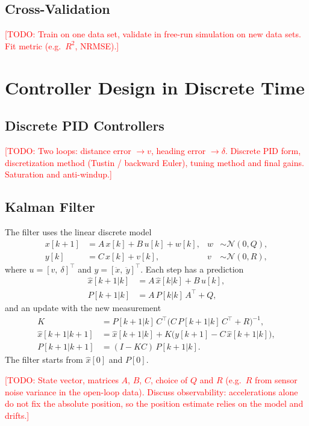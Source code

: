 \documentclass[conference]{IEEEtran}
\newcommand{\todo}[1]{\textcolor{red}{[TODO: #1]}}
\begin{document}
\subsection{Cross-Validation}
\todo{Train on one data set, validate in free-run simulation on new data
sets. Fit metric (e.g.\ $R^2$, NRMSE).}

\section{Controller Design in Discrete Time}

\subsection{Discrete PID Controllers}
\todo{Two loops: distance error $\to v$, heading error $\to \delta$.
Discrete PID form, discretization method (Tustin / backward Euler),
tuning method and final gains. Saturation and anti-windup.}

\subsection{Kalman Filter}
The filter uses the linear discrete model
\begin{align}
  x[k+1] &= A\,x[k] + B\,u[k] + w[k], & w &\sim \mathcal{N}(0, Q), \\
  y[k]   &= C\,x[k] + v[k],           & v &\sim \mathcal{N}(0, R),
\end{align}
where $u = [v,\ \delta]^\top$ and $y = [\ddot{x},\ \ddot{y}]^\top$. Each
step has a prediction
\begin{align}
  \hat{x}[k+1|k] &= A\,\hat{x}[k|k] + B\,u[k], \\
  P[k+1|k] &= A\,P[k|k]\,A^\top + Q,
\end{align}
and an update with the new measurement
\begin{align}
  K &= P[k+1|k]\,C^\top \bigl(C\,P[k+1|k]\,C^\top + R\bigr)^{-1}, \\
  \hat{x}[k+1|k+1] &= \hat{x}[k+1|k] + K\bigl(y[k+1] - C\,\hat{x}[k+1|k]\bigr), \\
  P[k+1|k+1] &= (I - K C)\,P[k+1|k].
\end{align}
The filter starts from $\hat{x}[0]$ and $P[0]$.

\todo{State vector, matrices $A$, $B$, $C$, choice of $Q$ and $R$
(e.g.\ $R$ from sensor noise variance in the open-loop data).
Discuss observability: accelerations alone do not fix the absolute
position, so the position estimate relies on the model and drifts.}
\end{document}
